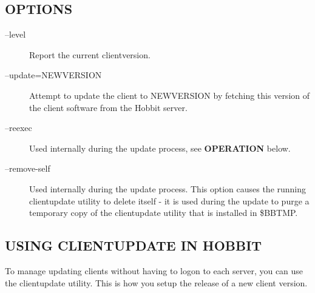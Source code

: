  
\subsection{OPTIONS}
\begin{description}
\item[--level] Report the current clientversion. 

 

\item[--update=NEWVERSION] Attempt to update the client to NEWVERSION by fetching this version of the client software from the Hobbit server. 

 

\item[--reexec] Used internally during the update process, see \textbf{OPERATION}
 below. 

 

\item[--remove-self] Used internally during the update process. This option causes the running clientupdate utility to delete itself - it is used during the update to purge a temporary copy of the clientupdate utility that is installed in \$BBTMP. 

 


\end{description}
\subsection{USING CLIENTUPDATE IN HOBBIT}
 To manage updating clients without having to logon to each server, you can use the clientupdate utility. This is how you setup the release of a new client version. 

